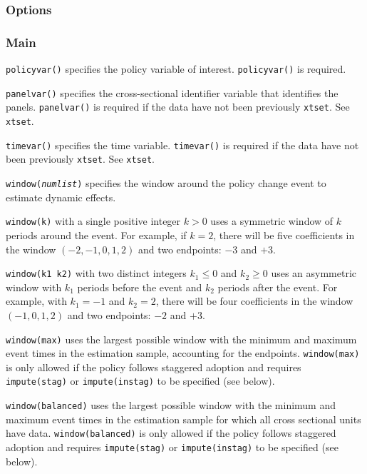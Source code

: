 \documentclass[12pt]{article}
\begin{document}
\subsubsection{Options}

\subsubsection{Main}

\hangpara
\texttt{policyvar(\varname)} specifies the policy variable of interest. \texttt{policyvar()} is required.

\hangpara
\texttt{panelvar(\varname)} specifies the cross-sectional identifier variable that identifies the panels.
\texttt{panelvar()} is required if the data have not been  previously \texttt{xtset}. See \texttt{xtset}.

\hangpara
\texttt{timevar(\varname)} specifies the time variable. \texttt{timevar()} is required if the data have not been previously \texttt{xtset}. See \texttt{xtset}.

\hangpara
{\tt window({\it numlist})} specifies the window around the policy change event to estimate dynamic effects.

\morehangpara
{\tt window(k)} with a single positive integer $k>0$ uses a symmetric window of $k$ periods around the event.
For example, if $k = 2$, there will be five coefficients in the window $(-2,-1,0,1,2)$ and two endpoints: $-3$ and $+3$.

\morehangpara
{\tt window(k1 k2)} with two distinct integers $k_1 \le 0$ and $k_2 \ge 0$ uses an asymmetric window with $k_1$ periods before the event and $k_2$ periods after the event.
For example, with $k_1 = -1$ and $k_2 = 2$, there will be four coefficients in the window $(-1,0,1,2)$ and two endpoints: $-2$ and $+3$.

\morehangpara
{\tt window(max)} uses the largest possible window with the minimum and maximum event times in the estimation sample, accounting for the endpoints.
{\tt window(max)} is only allowed if the policy follows staggered adoption and requires {\tt impute(stag)} or {\tt impute(instag)} to be specified (see below).

\morehangpara
{\tt window(balanced)} uses the largest possible window with the minimum and maximum event times in the estimation sample for which all cross sectional units have data.
{\tt window(balanced)} is only allowed if the policy follows staggered adoption and requires {\tt impute(stag)} or {\tt impute(instag)} to be specified (see below).
\end{document}
